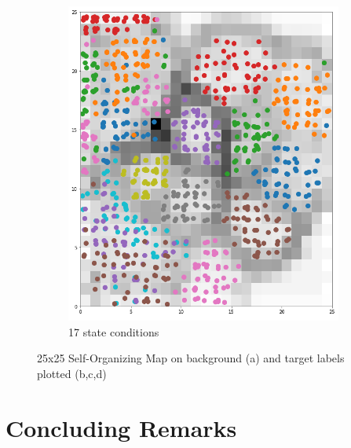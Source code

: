 \documentclass[twocolumn]{article}
\begin{document}
\begin{figure}
\begin{subfigure}{0.245\textwidth}
            \includegraphics[width=\textwidth]{som_17_2525.png}
            \caption{17 state conditions}
            \label{fig:som17_2525}
      \end{subfigure}

      \caption{25x25 Self-Organizing Map on background (a) and target labels plotted (b,c,d)}
      \label{fig:som_2525}
\end{figure}

%

\section{Concluding Remarks}
\end{document}
